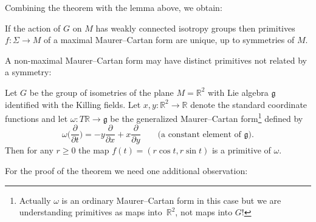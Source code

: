 Combining the theorem with the lemma above, we obtain:
\begin{Corollary}\label{uniquenessC}
 If the action of $G$ on $M$ has weakly connected isotropy groups
 then primitives $f \colon \Sigma \rightarrow M$ of a maximal
 Maurer--Cartan form are unique, up to symmetries of $M$.
\end{Corollary}

A non-maximal Maurer--Cartan form may have distinct primitives not
related by a symmetry:
\begin{Example} Let $G$ be the group of isometries of the plane
$M={\mathbb R}^2 $ with Lie algebra ${\mathfrak g} $ identified with
the Killing fields. Let $x, y \colon {\mathbb R}^2 \rightarrow
{\mathbb R} $ denote the standard coordinate functions and let $
\omega \colon T {\mathbb R} \rightarrow {\mathfrak g} $ be the
generalized Maurer--Cartan form\footnote{Actually $\omega $ is an
ordinary Maurer--Cartan form in this case but we are understanding
primitives as maps into~${\mathbb R}^2$, not maps into $G$!} defined
by
\begin{equation*}
\omega \bigg( \frac{\partial }{\partial t}\bigg)=
-y\frac{\partial }{\partial x }+x \frac{\partial }{\partial y}
\qquad\text{(a constant element of $\mathfrak g$).}
 \end{equation*}
 Then for any $r\ge 0$ the map $f (t)=(r\cos t, r\sin
t)$ is a primitive of $\omega $.
\end{Example}

For the proof of the theorem we need one additional observation:

